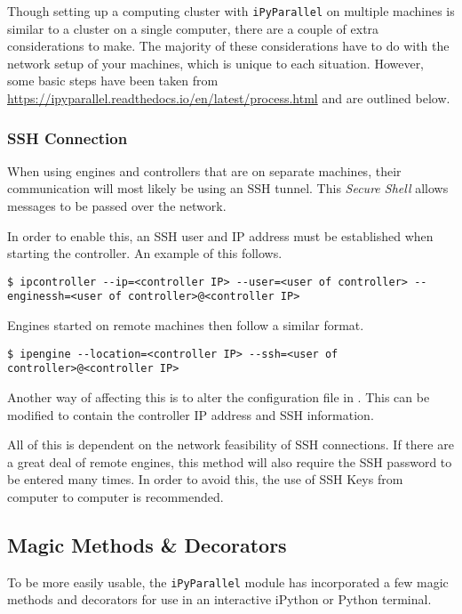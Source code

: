 Though setting up a computing cluster with \texttt{iPyParallel} on multiple machines is similar to a cluster on a single computer, there are a couple of extra considerations to make.
The majority of these considerations have to do with the network setup of your machines, which is unique to each situation.
However, some basic steps have been taken from \url{https://ipyparallel.readthedocs.io/en/latest/process.html} and are outlined below.

\subsubsection*{SSH Connection}
When using engines and controllers that are on separate machines, their communication will most likely be using an SSH tunnel.
This \emph{Secure Shell} allows messages to be passed over the network.

In order to enable this, an SSH user and IP address must be established when starting the controller.
An example of this follows.

\begin{lstlisting}[style=ShellInput]
$ ipcontroller --ip=<controller IP> --user=<user of controller> --enginessh=<user of controller>@<controller IP>
\end{lstlisting}

Engines started on remote machines then follow a similar format.

\begin{lstlisting}[style=ShellInput]
$ ipengine --location=<controller IP> --ssh=<user of controller>@<controller IP>
\end{lstlisting}

Another way of affecting this is to alter the configuration file in .
This can be modified to contain the controller IP address and SSH information.

All of this is dependent on the network feasibility of SSH connections.
If there are a great deal of remote engines, this method will also require the SSH password to be entered many times.
In order to avoid this, the use of SSH Keys from computer to computer is recommended.


\subsection*{Magic Methods \& Decorators}
To be more easily usable, the \texttt{iPyParallel} module has incorporated a few magic methods and decorators for use in an interactive iPython or Python terminal.

